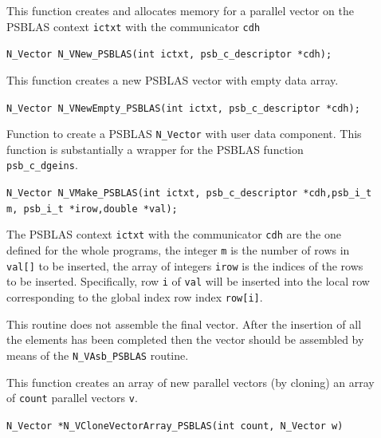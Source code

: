 \documentclass[twoside,a4paper]{refart}
\theoremstyle{definition}
\begin{document}
\begin{description}
	\item[] This function creates and allocates memory for a parallel vector
	on the PSBLAS context \lstinline[style=CStyle]|ictxt| with the communicator \lstinline[style=CStyle]|cdh|
	
	 \lstinline[style=CStyle]|N_Vector N_VNew_PSBLAS(int ictxt, psb_c_descriptor *cdh);|
	
	\item[] This function creates a new PSBLAS vector with empty data array.
	
	 \lstinline[style=CStyle]|N_Vector N_VNewEmpty_PSBLAS(int ictxt, psb_c_descriptor *cdh);|
	
	\item[] Function to create a PSBLAS \texttt{N\_Vector} with user data component. This function is substantially a wrapper for the PSBLAS function \lstinline[style=CStyle]|psb_c_dgeins|.
	
	 \lstinline[style=CStyle]|N_Vector N_VMake_PSBLAS(int ictxt, psb_c_descriptor *cdh,psb_i_t m, psb_i_t *irow,double *val);|
	
	The PSBLAS context \lstinline[style=CStyle]|ictxt| with the communicator \lstinline[style=CStyle]|cdh| are the one defined for the whole programs, the integer \lstinline[style=CStyle]{m} is the number of rows in \lstinline[style=CStyle]{val[]} to be inserted, the array of integers \lstinline[style=CStyle]{irow} is the indices of the rows to be inserted. Specifically, row \lstinline[style=CStyle]|i| of \lstinline[style=CStyle]|val| will be inserted into the local row corresponding to the global index row index \lstinline[style=CStyle]|row[i]|.
	
	\attention This routine does not assemble the final vector. After the insertion of all the elements has been completed then the vector should be assembled by means of the \texttt{N\_VAsb\_PSBLAS} routine.
	
	\item[] This function creates an array of new parallel vectors (by cloning) an array of \lstinline[style=CStyle]|count| parallel vectors \lstinline[style=CStyle]|v|.
	
	 \lstinline[style=CStyle]|N_Vector *N_VCloneVectorArray_PSBLAS(int count, N_Vector w)|
	

\end{description}
\end{document}
